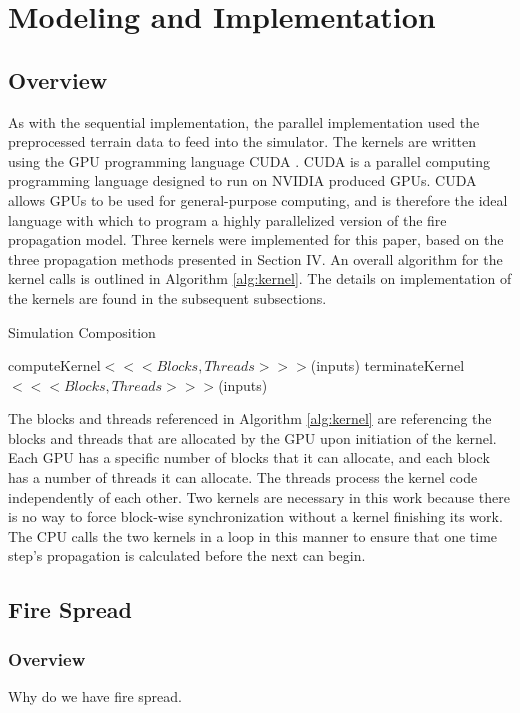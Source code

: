 \chapter{Modeling and Implementation}
\label{chapter:implementation}

\section{Overview}
As with the sequential implementation, the parallel implementation used the preprocessed terrain data to feed into the simulator. The kernels are written using the GPU programming language CUDA \cite{cuda}. CUDA is a parallel computing programming language designed to run on NVIDIA produced GPUs. CUDA allows GPUs to be used for general-purpose computing, and is therefore the ideal language with which to program a highly parallelized version of the fire propagation model. Three kernels were implemented for this paper, based on the three propagation methods presented in Section IV. An overall algorithm for the kernel calls is outlined in Algorithm \ref{alg:kernel}. The details on implementation of the kernels are found in the subsequent subsections.

\begin{algorithm}
  \small
  \caption{Simulation Composition}
  \label{alg:kernel}
  \begin{algorithmic}
  \STATE computeKernel$<<<Blocks,Threads>>>$(inputs)
  \STATE terminateKernel$<<<Blocks,Threads>>>$(inputs)
  \ENDWHILE
  \end{algorithmic}
\end{algorithm}

The blocks and threads referenced in Algorithm \ref{alg:kernel} are referencing the blocks and threads that are allocated by the GPU upon initiation of the kernel. Each GPU has a specific number of blocks that it can allocate, and each block has a number of threads it can allocate. The threads process the kernel code independently of each other. Two kernels are necessary in this work because there is no way to force block-wise synchronization without a kernel finishing its work. The CPU calls the two kernels in a loop in this manner to ensure that one time step's propagation is calculated before the next can begin. 

\section{Fire Spread}
\subsection{Overview}
Why do we have fire spread.

